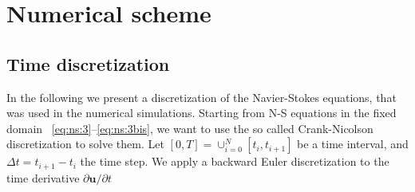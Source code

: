 \documentclass[a4paper,11pt,openright,twoside]{book}
\begin{document}
%




\section{Numerical scheme}

\subsection{Time discretization}
In the following we present a discretization of the Navier-Stokes equations, that was used in the numerical simulations. Starting from N-S equations in the fixed domain ~\eqref{eq:ns:3}--\eqref{eq:ns:3bis}, we want to use the so called Crank-Nicolson discretization to solve them. Let $[0, T] = \cup^N_{i=0} [t_i, t_{i+1}] $ be a time interval, and $\Delta t = t_{i+1} - t_i$ the time step. We apply a backward Euler discretization to the time derivative $\partial \mathbf{u}/ \partial t$
\end{document}
